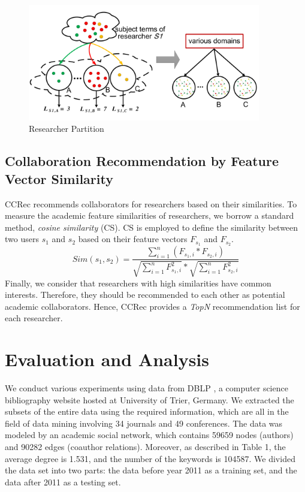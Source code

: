 \documentclass[review]{elsarticle}
\begin{document}
\begin{figure}
\centering
\includegraphics [width=4in]{Fig2.pdf}
\caption{Researcher Partition}
\end{figure}

\subsection{Collaboration Recommendation by Feature Vector Similarity}
CCRec recommends collaborators for researchers based on their similarities. To measure the academic feature similarities of researchers, we borrow a standard method, \emph{cosine similarity} (CS). CS is employed to define the similarity between two users $s_{1}$ and $s_{2}$ based on their feature vectors $F_{s_{1}}$ and $F_{s_{2}}$.
\begin{equation}
Sim(s_{1},s_{2})=\frac{\sum_{i=1}^{n}(F_{s_{1},i}*F_{s_{2},i})}{\sqrt{\sum_{i=1}^{n}F_{s_{1},i}^2}*\sqrt{\sum_{i=1}^{n}F_{s_{2},i}^2}}
\end{equation}
Finally, we consider that researchers with high similarities have common interests. Therefore, they should be recommended to each other as potential academic collaborators. Hence, CCRec provides a \emph{TopN} recommendation list for each researcher.

\section{Evaluation and Analysis}
We conduct various experiments using data from DBLP \cite{Ley:DBLP}, a computer science bibliography website hosted at University of Trier, Germany. We extracted the subsets of the entire data using the required information, which are all in the field of data mining involving 34 journals and 49 conferences. The data was modeled by an academic social network, which contains 59659 nodes (authors) and 90282 edges (coauthor relations). Moreover, as described in Table 1, the average degree is 1.531, and the number of the keywords is 104587. We divided the data set into two parts: the data before year 2011 as a training set, and the data after 2011 as a testing set.
\end{document}

